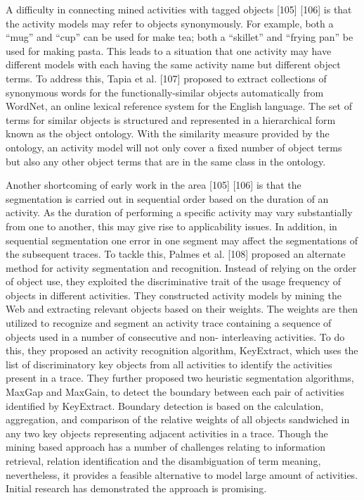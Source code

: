 A difficulty in connecting mined activities with tagged objects [105] [106] is that the activity models may refer to objects synonymously. For example, both a “mug” and “cup” can be used for make tea; both a “skillet” and “frying pan” be used for making pasta. This leads to a situation that one activity may have different models with each having the same activity name but different object terms. To address this, Tapia et al. [107] proposed to extract collections of synonymous words for the functionally-similar objects automatically from WordNet, an online lexical reference system for the English language. The set of terms for similar objects is structured and represented in a hierarchical form known as the object ontology. With the similarity measure provided by the ontology, an activity model will not only cover a fixed number of object terms but also any other object terms that are in the same class in the ontology. 

Another shortcoming of early work in the area [105] [106] is that the segmentation is carried out in sequential order based on the duration of an activity. As the duration of performing a specific activity may vary substantially from one to another, this may give rise to applicability issues. In addition, in sequential segmentation one error in one segment may affect the segmentations of the subsequent traces. To tackle this, Palmes et al. [108] proposed an alternate method for activity segmentation and recognition. Instead of relying on the order of object use, they exploited the discriminative trait of the usage frequency of objects in different activities. They constructed activity models by mining the Web and extracting relevant objects based on their weights. The weights are then utilized to recognize and segment an activity trace containing a sequence of objects used in a number of consecutive and non- interleaving activities. To do this, they proposed an activity recognition algorithm, KeyExtract, which uses the list of discriminatory key objects from all activities to identify the activities present in a trace. They further proposed two heuristic segmentation algorithms, MaxGap and MaxGain, to detect the boundary between each pair of activities identified by KeyExtract. Boundary detection is based on the calculation, aggregation, and comparison of the relative weights of all objects sandwiched in any two key objects representing adjacent activities in a trace. Though the mining based approach has a number of challenges relating to information retrieval, relation identification and the disambiguation of term meaning, nevertheless, it provides a feasible alternative to model large amount of activities. Initial research has demonstrated the approach is promising. 

